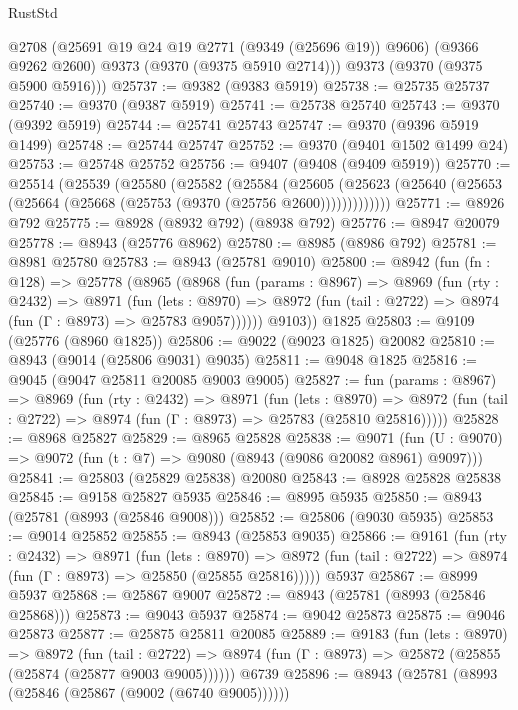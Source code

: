 \begin{lexlean}{RustStd}
\begin{coremodule}
        @2708
        (@25691 @19 @24 @19 @2771 (@9349 (@25696 @19)) @9606)
        (@9366 @9262 @2600)
        @9373
        (@9370 (@9375 @5910 @2714)))
      @9373
      (@9370 (@9375 @5900 @5916)))
@25737 := @9382 (@9383 @5919)
@25738 := @25735 @25737
@25740 := @9370 (@9387 @5919)
@25741 := @25738 @25740
@25743 := @9370 (@9392 @5919)
@25744 := @25741 @25743
@25747 := @9370 (@9396 @5919 @1499)
@25748 := @25744 @25747
@25752 := @9370 (@9401 @1502 @1499 @24)
@25753 := @25748 @25752
@25756 := @9407 (@9408 (@9409 @5919))
@25770 := @25514
    (@25539
      (@25580
        (@25582
          (@25584
            (@25605
              (@25623 (@25640 (@25653 (@25664 (@25668 (@25753 (@9370 (@25756 @2600)))))))))))))
@25771 := @8926 @792
@25775 := @8928 (@8932 @792) (@8938 @792)
@25776 := @8947 @20079
@25778 := @8943 (@25776 @8962)
@25780 := @8985 (@8986 @792)
@25781 := @8981 @25780
@25783 := @8943 (@25781 @9010)
@25800 := @8942
    (fun (fn : @128) =>
    @25778
      (@8965
        (@8968
          (fun (params : @8967) =>
          @8969
            (fun (rty : @2432) =>
            @8971
              (fun (lets : @8970) =>
              @8972 (fun (tail : @2722) => @8974 (fun (Γ : @8973) => @25783 @9057))))))
        @9103))
    @1825
@25803 := @9109 (@25776 (@8960 @1825))
@25806 := @9022 (@9023 @1825) @20082
@25810 := @8943 (@9014 (@25806 @9031) @9035)
@25811 := @9048 @1825
@25816 := @9045 (@9047 @25811 @20085 @9003 @9005)
@25827 := fun (params : @8967) =>
  @8969
    (fun (rty : @2432) =>
    @8971
      (fun (lets : @8970) =>
      @8972 (fun (tail : @2722) => @8974 (fun (Γ : @8973) => @25783 (@25810 @25816)))))
@25828 := @8968 @25827
@25829 := @8965 @25828
@25838 := @9071
    (fun (U : @9070) => @9072 (fun (t : @7) => @9080 (@8943 (@9086 @20082 @8961) @9097)))
@25841 := @25803 (@25829 @25838) @20080
@25843 := @8928 @25828 @25838
@25845 := @9158 @25827 @5935
@25846 := @8995 @5935
@25850 := @8943 (@25781 (@8993 (@25846 @9008)))
@25852 := @25806 (@9030 @5935)
@25853 := @9014 @25852
@25855 := @8943 (@25853 @9035)
@25866 := @9161
    (fun (rty : @2432) =>
    @8971
      (fun (lets : @8970) =>
      @8972 (fun (tail : @2722) => @8974 (fun (Γ : @8973) => @25850 (@25855 @25816)))))
    @5937
@25867 := @8999 @5937
@25868 := @25867 @9007
@25872 := @8943 (@25781 (@8993 (@25846 @25868)))
@25873 := @9043 @5937
@25874 := @9042 @25873
@25875 := @9046 @25873
@25877 := @25875 @25811 @20085
@25889 := @9183
    (fun (lets : @8970) =>
    @8972
      (fun (tail : @2722) =>
      @8974 (fun (Γ : @8973) => @25872 (@25855 (@25874 (@25877 @9003 @9005))))))
    @6739
@25896 := @8943 (@25781 (@8993 (@25846 (@25867 (@9002 (@6740 @9005))))))

\end{coremodule}
\end{lexlean}
